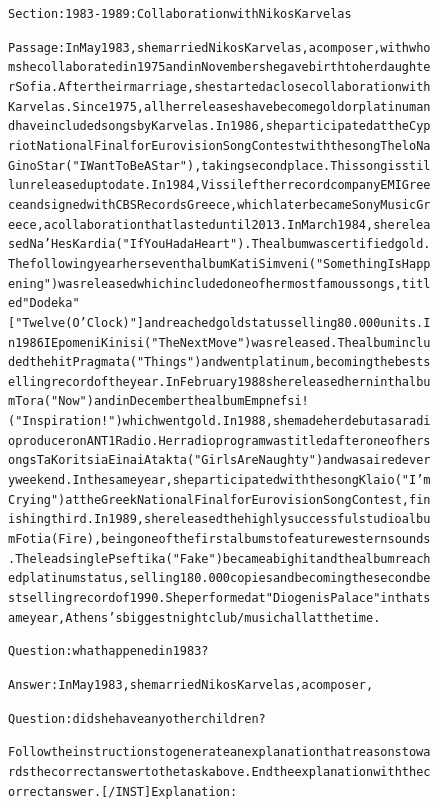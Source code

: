 \begin{figure}[t]
{{\begin{alltt}
Section: 1983-1989: Collaboration with Nikos Karvelas

Passage: In May 1983, she married Nikos Karvelas, a composer, with whom she collaborated in 1975 and in November she gave birth to her daughter Sofia. After their marriage, she started a close collaboration with Karvelas. Since 1975, all her releases have become gold or platinum and have included songs by Karvelas. In 1986, she participated at the Cypriot National Final for Eurovision Song Contest with the song Thelo Na Gino Star ("I Want To Be A Star"), taking second place. This song is still unreleased up to date. In 1984, Vissi left her record company EMI Greece and signed with CBS Records Greece, which later became Sony Music Greece, a collaboration that lasted until 2013. In March 1984, she released Na 'Hes Kardia ("If You Had a Heart"). The album was certified gold. The following year her seventh album Kati Simveni ("Something Is Happening") was released which included one of her most famous songs, titled "Dodeka" ["Twelve (O'Clock)"] and reached gold status selling 80.000 units. In 1986 I Epomeni Kinisi ("The Next Move") was released. The album included the hit Pragmata ("Things") and went platinum, becoming the best selling record of the year. In February 1988 she released her ninth album Tora ("Now") and in December the album Empnefsi! ("Inspiration!") which went gold. In 1988, she made her debut as a radio producer on ANT1 Radio. Her radio program was titled after one of her songs Ta Koritsia Einai Atakta ("Girls Are Naughty") and was aired every weekend. In the same year, she participated with the song Klaio ("I'm Crying") at the Greek National Final for Eurovision Song Contest, finishing third. In 1989, she released the highly successful studio album Fotia (Fire), being one of the first albums to feature western sounds. The lead single Pseftika ("Fake") became a big hit and the album reached platinum status, selling 180.000 copies and becoming the second best selling record of 1990. She performed at "Diogenis Palace" in that same year, Athens's biggest nightclub/music hall at the time.

Question: what happened in 1983?

Answer: In May 1983, she married Nikos Karvelas, a composer,

Question: did she have any other children?

Follow the instructions to generate an explanation that reasons towards the correct answer to the task above. End the explanation with the correct answer. [/INST] Explanation: 


\end{alltt}}}
\end{figure}
